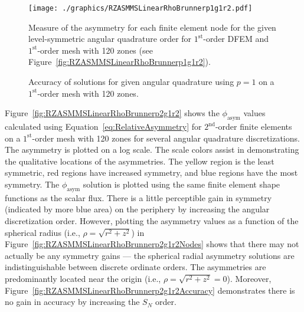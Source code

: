 \documentclass[12pt,letterpaper]{article}
\begin{document}
\begin{figure}[!htb]
\centering
\texttt{[image: ./graphics/RZASMMSLinearRhoBrunnerp1g1r2.pdf]}
\caption{Measure of the asymmetry for each finite element node for the given level-symmetric angular quadrature order for $1^\text{st}$-order DFEM and $1^\text{st}$-order mesh with 120 zones (see Figure~\ref{fig:RZASMMSLinearRhoBrunnerp1g1r2}).}
\label{fig:RZASMMSLinearRhoBrunnerp1g1r2Nodes}
\end{figure}

\begin{figure}[!htb]
\centering
{}
\caption{Accuracy of solutions for given angular quadrature using $p=1$ on a $1^\text{st}$-order mesh with 120 zones.}
\label{fig:RZASMMSLinearRhoBrunnerp1g1r2Accuracy}
\end{figure}

\FloatBarrier

Figure~\ref{fig:RZASMMSLinearRhoBrunnerp2g1r2} shows the $\phi_\text{asym}$ values calculated using Equation~\ref{eq:RelativeAsymmetry} for $2^\text{nd}$-order finite elements on a $1^\text{st}$-order mesh with 120 zones for several angular quadrature discretizations. The asymmetry is plotted on a log scale. The scale colors assist in demonstrating the qualitative locations of the asymmetries. The yellow region is the least symmetric, red regions have increased symmetry, and blue regions have the most symmetry. The $\phi_\text{asym}$ solution is plotted using the same finite element shape functions as the scalar flux. There is a little perceptible gain in symmetry (indicated by more blue area) on the periphery by increasing the angular discretization order. However, plotting the asymmetry values as a function of the spherical radius (i.e., $\rho=\sqrt{r^2+z^2}$) in Figure~\ref{fig:RZASMMSLinearRhoBrunnerp2g1r2Nodes} shows that there may not actually be any symmetry gains --- the spherical radial asymmetry solutions are indistinguishable between discrete ordinate orders. The asymmetries are predominantly located near the origin (i.e., $\rho=\sqrt{r^2+z^2}=0$). Moreover, Figure~\ref{fig:RZASMMSLinearRhoBrunnerp2g1r2Accuracy} demonstrates there is no gain in accuracy by increasing the $S_N$ order.
\end{document}
